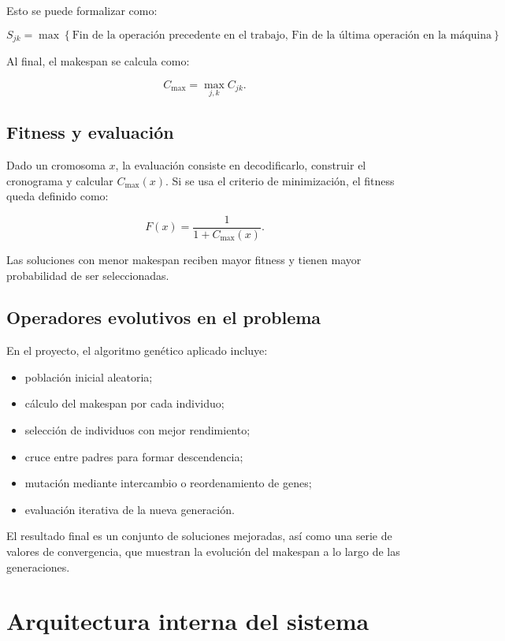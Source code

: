 \documentclass[11pt,a4paper]{article}
\begin{document}
Esto se puede formalizar como:

$$
S_{jk} = \max\left\{\text{Fin de la operación precedente en el trabajo},\,\text{Fin de la última operación en la máquina}\right\}.
$$

Al final, el makespan se calcula como:

$$
C_{\max} = \max_{j,k} C_{jk}.
$$

\subsection{Fitness y evaluación}

Dado un cromosoma $x$, la evaluación consiste en decodificarlo, construir el cronograma y calcular $C_{\max}(x)$. Si se usa el criterio de minimización, el fitness queda definido como:

$$
F(x) = \frac{1}{1 + C_{\max}(x)}.
$$

Las soluciones con menor makespan reciben mayor fitness y tienen mayor probabilidad de ser seleccionadas.

\subsection{Operadores evolutivos en el problema}

En el proyecto, el algoritmo genético aplicado incluye:

\begin{itemize}
    \item población inicial aleatoria;
    \item cálculo del makespan por cada individuo;
    \item selección de individuos con mejor rendimiento;
    \item cruce entre padres para formar descendencia;
    \item mutación mediante intercambio o reordenamiento de genes;
    \item evaluación iterativa de la nueva generación.
\end{itemize}

El resultado final es un conjunto de soluciones mejoradas, así como una serie de valores de convergencia, que muestran la evolución del makespan a lo largo de las generaciones.

\section{Arquitectura interna del sistema}
\end{document}
